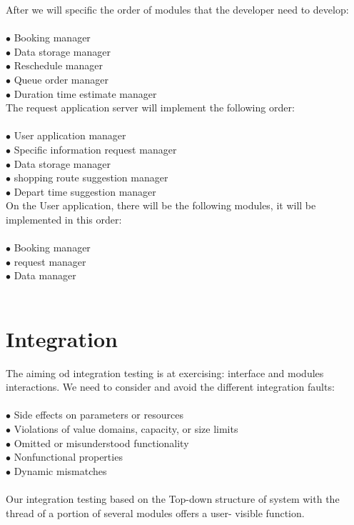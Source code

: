 \documentclass[a4paper,12pt]{report}
\begin{document}
After we will specific the order of modules that the developer need to develop:~\\
~\\
$\bullet$ Booking manager~\\
$\bullet$ Data storage manager~\\
$\bullet$ Reschedule manager~\\
$\bullet$ Queue order manager~\\
$\bullet$ Duration time estimate manager~\\


The request application server will implement the following order:~\\
~\\
$\bullet$ User application manager~\\
$\bullet$ Specific information request manager~\\
$\bullet$ Data storage manager~\\
$\bullet$ shopping route suggestion manager~\\
$\bullet$ Depart time suggestion manager~\\

On the User application, there will be the following modules,  it will be implemented in this order:~\\
~\\
$\bullet$ Booking manager~\\
$\bullet$ request manager~\\
$\bullet$ Data manager~\\
~\\
\section{Integration}
The aiming od integration testing is at exercising: interface and modules interactions. We need to consider and avoid the different integration faults:~\\
~\\
$\bullet$ Side effects on parameters or resources~\\
$\bullet$ Violations of value domains, capacity, or size limits~\\
$\bullet$ Omitted or misunderstood functionality~\\
$\bullet$ Nonfunctional properties~\\
$\bullet$ Dynamic mismatches~\\
~\\
Our integration testing based on the Top-down structure of system with the thread of a portion of several modules offers a user- visible function.~\\
~\\
\end{document}
